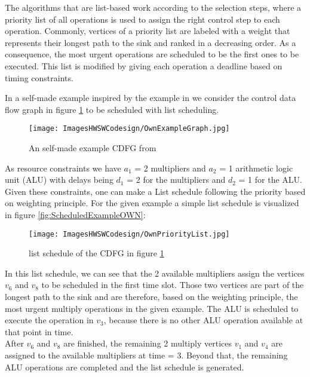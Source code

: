 \documentclass[conference]{IEEEtran}
\begin{document}
The algorithms that are list-based work according to the selection steps, where a priority list of all operations is used to assign the right control step to each operation\cite{SynthesisAndOptimization}. Commonly, vertices of a priority list are labeled with a weight that represents their longest path to the sink and ranked in a decreasing order\cite{SynthesisAndOptimization}. As a consequence, the most urgent operations are scheduled to be the first ones to be executed\cite{SynthesisAndOptimization}. This list is modified by giving each operation a deadline based on timing constraints\cite{SynthesisAndOptimization}.

In a self-made example inspired by the example in \cite{SynthesisAndOptimization} we consider the control data flow graph in figure \ref{fig:CDFGExampleOWN} to be scheduled with list scheduling.

\begin{figure}[htbp]
    \centering
    \texttt{[image: ImagesHWSWCodesign/OwnExampleGraph.jpg]}
    \caption{An self-made example CDFG from  \cite{SynthesisAndOptimization}}
    \label{fig:CDFGExampleOWN}
\end{figure}

As resource constraints we have $a_1$ = 2 multipliers and $a_2$ = 1 arithmetic logic unit (ALU) with delays being $d_1$ = 2 for the multipliers and $d_2$ = 1 for the ALU. Given these constraints, one can make a List schedule following the priority based on weighting principle\cite{SynthesisAndOptimization}. For the given example a simple list schedule is visualized in figure \ref{fig:ScheduledExampleOWN}:

\begin{figure}[htbp]
    \centering
    \texttt{[image: ImagesHWSWCodesign/OwnPriorityList.jpg]}
    \caption{list schedule of the CDFG in figure \ref{fig:CDFGExampleOWN}}
    \label{fig:PrioritylistOWN}
\end{figure}

In this list schedule, we can see that the 2 available multipliers assign the vertices $v_6$ and $v_8$ to be scheduled in the first time slot. Those two vertices are part of the longest path to the sink and are therefore, based on the weighting principle, the most urgent multiply operations in the given example. The ALU is scheduled to execute the operation in $v_3$, because there is no other ALU operation available at that point in time.\\

After $v_6$ and $v_8$ are finished, the remaining 2 multiply vertices $v_1$ and $v_4$ are assigned to the available multipliers at time = $3$. Beyond that, the remaining ALU operations are completed and the list schedule is generated.\\
\end{document}
